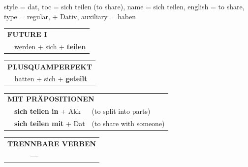 \begin{verbentry}{
  style = {dat},
  toc = {sich teilen (to share)},
  name = {sich teilen},
  english = {to share},
  type = {regular, + Dativ},
  auxiliary = {haben}
}
\begin{tabular}{rl}
    \multicolumn{2}{l}{\textbf{FUTURE I} }\\
    &werden + sich + \textbf{teilen}\\
 
  \end{tabular}
\hfill
   \begin{tabular}{rl}
      \multicolumn{2}{l}{\textbf{PLUSQUAMPERFEKT}}\\
    &hatten + sich + \textbf{geteilt}\\
  \end{tabular}
  
\vspace{10pt}

   \begin{tabular}{lll}
      \multicolumn{3}{l}{\textbf{MIT PRÄPOSITIONEN}}\\
& \textbf{sich teilen in} + Akk & (to split into parts)\\
& \textbf{sich teilen mit} + Dat & (to share with someone)
  \end{tabular}
\hfill
\begin{tabular}{lll}
\multicolumn{3}{l}{\textbf{TRENNBARE VERBEN}}\\
& \textbf{---} & \\
\end{tabular}


  \vspace{-5pt}
\end{verbentry}

